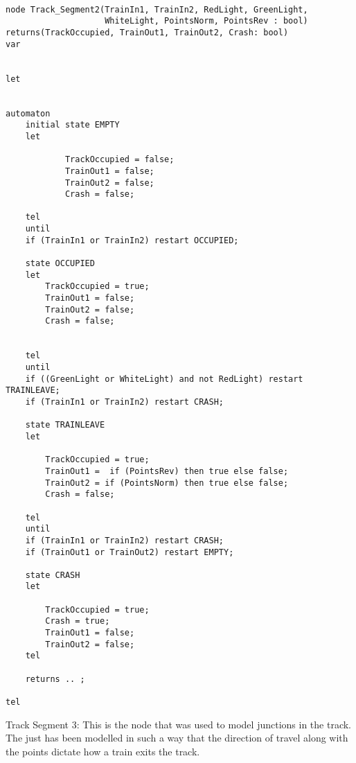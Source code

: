 \begin{verbatim}

node Track_Segment2(TrainIn1, TrainIn2, RedLight, GreenLight,
                    WhiteLight, PointsNorm, PointsRev : bool)
returns(TrackOccupied, TrainOut1, TrainOut2, Crash: bool)
var


let


automaton
	initial state EMPTY
	let
	
			TrackOccupied = false; 
			TrainOut1 = false; 
			TrainOut2 = false;
			Crash = false;
	
	tel
	until
	if (TrainIn1 or TrainIn2) restart OCCUPIED;
	
	state OCCUPIED
	let
		TrackOccupied = true;
		TrainOut1 = false;
		TrainOut2 = false;
		Crash = false;
		
	
	tel
	until
	if ((GreenLight or WhiteLight) and not RedLight) restart TRAINLEAVE;
	if (TrainIn1 or TrainIn2) restart CRASH;
	
	state TRAINLEAVE
	let
	
		TrackOccupied = true;
		TrainOut1 =  if (PointsRev) then true else false;
		TrainOut2 = if (PointsNorm) then true else false;
		Crash = false;
	
	tel
	until 
	if (TrainIn1 or TrainIn2) restart CRASH;
	if (TrainOut1 or TrainOut2) restart EMPTY;
	
	state CRASH
	let
	
		TrackOccupied = true;
		Crash = true;
		TrainOut1 = false;
		TrainOut2 = false;
	tel
	
	returns .. ;

tel

\end{verbatim}

 Track Segment 3: This is the node that was used to model junctions in the track. The just has
 been modelled in such a way that the direction of
 travel along with the points dictate how a train exits the track. 




